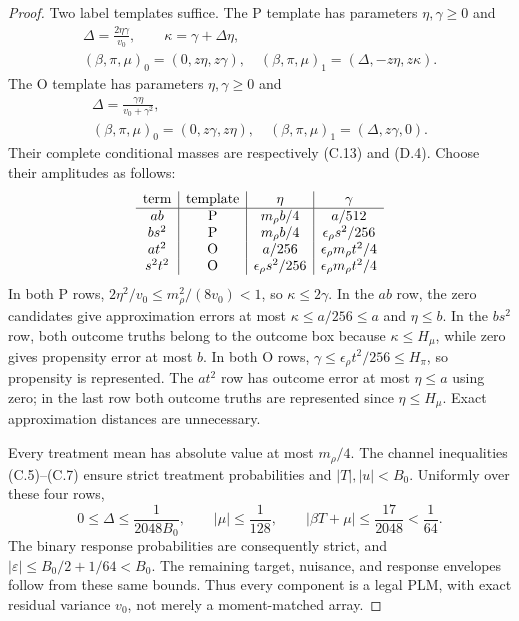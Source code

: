 \begin{proof}
Two label templates suffice. The P template has parameters
$\eta,\gamma\ge0$ and
\[
 \begin{gathered}
 \Delta=\frac{2\eta\gamma}{v_0},\qquad
 \kappa=\gamma+\Delta\eta,\\
 (\beta,\pi,\mu)_0=(0,z\eta,z\gamma),\quad
 (\beta,\pi,\mu)_1=(\Delta,-z\eta,z\kappa).
 \end{gathered}
\]
The O template has parameters $\eta,\gamma\ge0$ and
\[
 \begin{gathered}
 \Delta=\frac{\gamma\eta}{v_0+\gamma^2},\\
 (\beta,\pi,\mu)_0=(0,z\gamma,z\eta),\quad
 (\beta,\pi,\mu)_1=(\Delta,z\gamma,0).
 \end{gathered}
\]
Their complete conditional masses are respectively (C.13) and (D.4).
Choose their amplitudes as follows:
\begin{equation}
\begin{array}{c|c|c|c}
 \text{term}&\text{template}&\eta&\gamma\\ \hline
 ab&{\rm P}&m_\rho b/4&a/512\\
 bs^2&{\rm P}&m_\rho b/4&\epsilon_\rho s^2/256\\
 at^2&{\rm O}&a/256&\epsilon_\rho m_\rho t^2/4\\
 s^2t^2&{\rm O}&\epsilon_\rho s^2/256&
                        \epsilon_\rho m_\rho t^2/4
\end{array}
\label{eq:adaptation-box-witness-scales}
\end{equation}
In both P rows,
$2\eta^2/v_0\le m_\rho^2/(8v_0)<1$, so $\kappa\le2\gamma$.
In the $ab$ row, the zero candidates give approximation errors at
most $\kappa\le a/256\le a$ and $\eta\le b$.
In the $bs^2$ row, both outcome truths belong to the outcome box
because $\kappa\le H_\mu$, while zero gives propensity error at most
$b$. In both O rows,
$\gamma\le\epsilon_\rho t^2/256\le H_\pi$, so propensity is represented.
The $at^2$ row has outcome error at most $\eta\le a$ using zero;
in the last row both outcome truths are represented since
$\eta\le H_\mu$. Exact approximation distances are unnecessary.

Every treatment mean has absolute value at most $m_\rho/4$.
The channel inequalities (C.5)--(C.7) ensure strict treatment
probabilities and $|T|,|u|<B_0$. Uniformly over these four rows,
\[
 0\le\Delta\le\frac1{2048B_0},\qquad |\mu|\le\frac1{128},
 \qquad |\beta T+\mu|\le\frac{17}{2048}<\frac1{64}.
\]
The binary response probabilities are consequently strict, and
$|\varepsilon|\le B_0/2+1/64<B_0$.
The remaining target, nuisance, and response envelopes follow from
these same bounds. Thus every component is a legal PLM, with exact
residual variance $v_0$, not merely a moment-matched array.


\end{proof}
